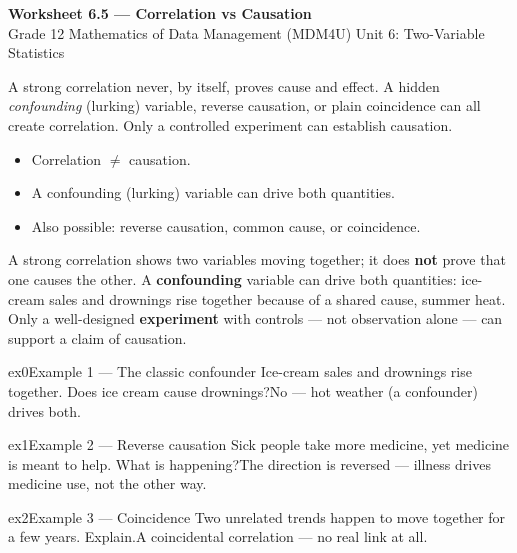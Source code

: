 \documentclass[11pt]{article}
\begin{document}
\begin{center}
{\LARGE\bfseries\color{titleblue}Worksheet 6.5 --- Correlation vs Causation}\\[2pt]
{\small Grade 12 Mathematics of Data Management (MDM4U) \textperiodcentered{} Unit 6: Two-Variable Statistics}
\end{center}

\begin{ideabox}
A strong correlation never, by itself, proves cause and effect. A hidden \emph{confounding} (lurking) variable, reverse causation, or plain coincidence can all create correlation. Only a controlled experiment can establish causation.
\begin{itemize}[leftmargin=*,itemsep=2pt]
  \item Correlation $\ne$ causation.
  \item A confounding (lurking) variable can drive both quantities.
  \item Also possible: reverse causation, common cause, or coincidence.
\end{itemize}
\end{ideabox}

\begin{learnbox}
A strong correlation shows two variables moving together; it does \textbf{not} prove that one causes the other.
A \textbf{confounding} variable can drive both quantities: ice-cream sales and drownings rise together because of a shared cause, summer heat.
Only a well-designed \textbf{experiment} with controls — not observation alone — can support a claim of causation.
\end{learnbox}


\begin{example}{ex0}{Example 1 --- The classic confounder}
Ice-cream sales and drownings rise together. Does ice cream cause drownings?\soln No --- hot weather (a confounder) drives both.
\end{example}

\begin{example}{ex1}{Example 2 --- Reverse causation}
Sick people take more medicine, yet medicine is meant to help. What is happening?\soln The direction is reversed --- illness drives medicine use, not the other way.
\end{example}

\begin{example}{ex2}{Example 3 --- Coincidence}
Two unrelated trends happen to move together for a few years. Explain.\soln A coincidental correlation --- no real link at all.
\end{example}
\end{document}

